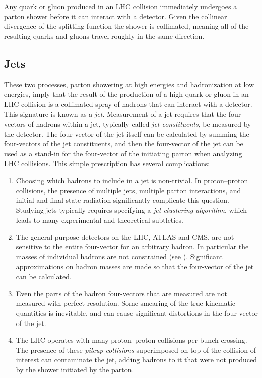 Any quark or gluon produced in an LHC collision immediately undergoes a parton shower before it can interact with a detector.
Given the collinear divergence of the splitting function the shower is collimated, meaning all of the resulting quarks and gluons travel roughly in the same direction.

\subsection{Jets}

These two processes, parton showering at high energies and hadronization at low energies, imply that the result of the production of a high \pt quark or gluon in an LHC collision is a collimated spray of hadrons that can interact with a detector.
This signature is known as a \textit{jet}.
Measurement of a jet requires that the four-vectors of hadrons within a jet, typically called \textit{jet constituents}, be measured by the detector.
The four-vector of the jet itself can be calculated by summing the four-vectors of the jet constituents, and then the four-vector of the jet can be used as a stand-in for the four-vector of the initiating parton when analyzing LHC collisions.
This simple prescription has several complications:

\begin{enumerate}
  \item{
    Choosing which hadrons to include in a jet is non-trivial.
    In proton--proton collisions, the presence of multiple jets, multiple parton interactions, and initial and final state radiation significantly complicate this question.
    Studying jets typically requires specifying a \textit{jet clustering algorithm}, which leads to many experimental and theoretical subtleties.
  }
  \item{
    The general purpose detectors on the LHC, ATLAS and CMS, are not sensitive to the entire four-vector for an arbitrary hadron.
    In particular the masses of individual hadrons are not constrained (see ).
    Significant approximations on hadron masses are made so that the four-vector of the jet can be calculated.
  }
  \item{
    Even the parts of the hadron four-vectors that are measured are not measured with perfect resolution.
    Some smearing of the true kinematic quantities is inevitable, and can cause significant distortions in the four-vector of the jet.
  }
  \item{
    The LHC operates with many proton--proton collisions per bunch crossing.
    The presence of these \textit{pileup collisions} superimposed on top of the collision of interest can contaminate the jet, adding hadrons to it that were not produced by the shower initiated by the parton.
  }
\end{enumerate}

